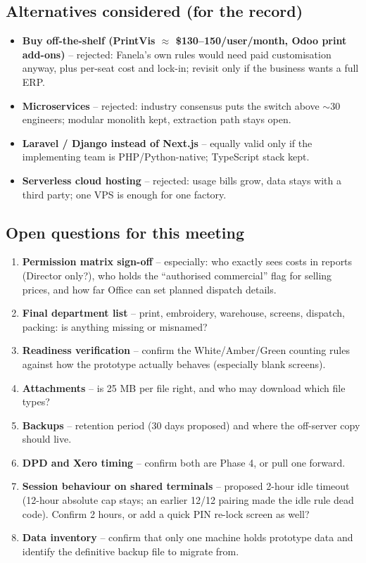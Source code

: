 \subsection*{Alternatives considered (for the record)}

\begin{itemize}
  \item \textbf{Buy off-the-shelf (PrintVis $\approx$ \$130--150/user/month, Odoo
        print add-ons)} -- rejected: Fanela's own rules would need paid customisation
        anyway, plus per-seat cost and lock-in; revisit only if the business wants a
        full ERP.
  \item \textbf{Microservices} -- rejected: industry consensus puts the switch above
        $\sim$30 engineers; modular monolith kept, extraction path stays open.
  \item \textbf{Laravel / Django instead of Next.js} -- equally valid only if the
        implementing team is PHP/Python-native; TypeScript stack kept.
  \item \textbf{Serverless cloud hosting} -- rejected: usage bills grow, data stays
        with a third party; one VPS is enough for one factory.
\end{itemize}

\subsection*{Open questions for this meeting}

\begin{enumerate}
  \item \textbf{Permission matrix sign-off} -- especially: who exactly sees costs in
        reports (Director only?), who holds the ``authorised commercial'' flag for
        selling prices, and how far Office can set planned dispatch details.
  \item \textbf{Final department list} -- print, embroidery, warehouse, screens,
        dispatch, packing: is anything missing or misnamed?
  \item \textbf{Readiness verification} -- confirm the White/Amber/Green counting rules
        against how the prototype actually behaves (especially blank screens).
  \item \textbf{Attachments} -- is 25 MB per file right, and who may download which
        file types?
  \item \textbf{Backups} -- retention period (30 days proposed) and where the off-server
        copy should live.
  \item \textbf{DPD and Xero timing} -- confirm both are Phase 4, or pull one forward.
  \item \textbf{Session behaviour on shared terminals} -- proposed 2-hour idle timeout
        (12-hour absolute cap stays; an earlier 12/12 pairing made the idle rule dead
        code). Confirm 2 hours, or add a quick PIN re-lock screen as well?
  \item \textbf{Data inventory} -- confirm that only one machine holds prototype data
        and identify the definitive backup file to migrate from.
\end{enumerate}


